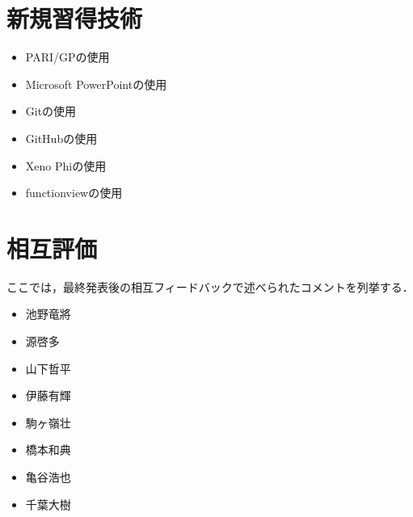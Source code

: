 \documentclass[openany,11pt,papersize]{jsbook}
\begin{document}
\appendix
\chapter{新規習得技術}

\begin{itemize}
\item PARI/GPの使用
\item Microsoft PowerPointの使用
\item Gitの使用
\item GitHubの使用
\item Xeno Phiの使用
\item functionviewの使用
\end{itemize}


\chapter{相互評価}
ここでは，最終発表後の相互フィードバックで述べられたコメントを列挙する．
\begin{itemize}
\item 池野竜將
\item 源啓多
\item 山下哲平
\item 伊藤有輝
\item 駒ヶ嶺壮
\item 橋本和典
\item 亀谷浩也
\item 千葉大樹
\end{itemize}

\end{document}

